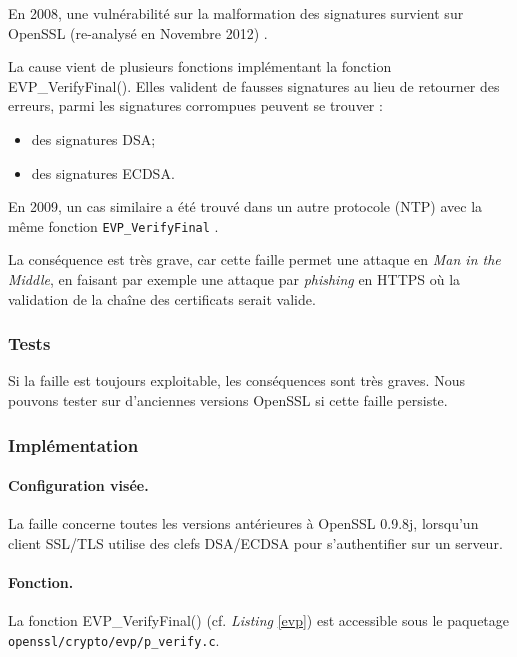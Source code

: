 		En 2008, une vulnérabilité sur la malformation des signatures survient sur OpenSSL (re-analysé en Novembre 2012) \cite{openssl2009secadv} \cite{cve-2008-5077}. 

		La cause vient de plusieurs fonctions implémentant la fonction EVP\_VerifyFinal(). Elles valident de fausses signatures au lieu de retourner des erreurs, parmi les signatures corrompues peuvent se trouver :
		\begin{itemize}
		\item des signatures DSA;
		\item des signatures ECDSA.\\
		\end{itemize}

		En 2009, un cas similaire a été trouvé dans un autre protocole (NTP) avec la même fonction \texttt{EVP\_VerifyFinal} \cite{cve-2009-0021}.

		La conséquence est très grave, car cette faille permet une attaque en \textit{Man in the Middle}, en faisant par exemple une attaque par \textit{phishing} en HTTPS où la validation de la chaîne des certificats serait valide.

		\subsubsection{Tests}

		Si la faille est toujours exploitable, les conséquences sont très graves. Nous pouvons tester sur d'anciennes versions OpenSSL si cette faille persiste.
		
		\subsubsection{Implémentation}
			
			\paragraph{Configuration visée.\\}
			
			La faille concerne toutes les versions antérieures à OpenSSL 0.9.8j, lorsqu'un client SSL/TLS utilise des clefs DSA/ECDSA pour s'authentifier sur un serveur. 

			\paragraph{Fonction.\\}
			La fonction EVP\_VerifyFinal() (cf. \textit{Listing} \ref{evp}) est accessible sous le paquetage \texttt{openssl/crypto/evp/p\_verify.c}.
		
